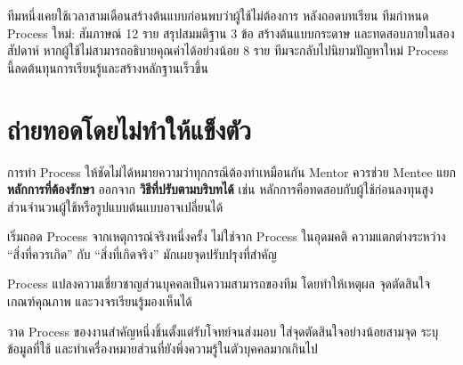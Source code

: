 \begin{examplebox}
ทีมหนึ่งเคยใช้เวลาสามเดือนสร้างต้นแบบก่อนพบว่าผู้ใช้ไม่ต้องการ หลังถอดบทเรียน ทีมกำหนด Process ใหม่: สัมภาษณ์ 12 ราย สรุปสมมติฐาน 3 ข้อ สร้างต้นแบบกระดาษ และทดสอบภายในสองสัปดาห์ หากผู้ใช้ไม่สามารถอธิบายคุณค่าได้อย่างน้อย 8 ราย ทีมจะกลับไปนิยามปัญหาใหม่ Process นี้ลดต้นทุนการเรียนรู้และสร้างหลักฐานเร็วขึ้น
\end{examplebox}

\section{ถ่ายทอดโดยไม่ทำให้แข็งตัว}
การทำ Process ให้ชัดไม่ได้หมายความว่าทุกกรณีต้องทำเหมือนกัน Mentor ควรช่วย Mentee แยก \textbf{หลักการที่ต้องรักษา} ออกจาก \textbf{วิธีที่ปรับตามบริบทได้} เช่น หลักการคือทดสอบกับผู้ใช้ก่อนลงทุนสูง ส่วนจำนวนผู้ใช้หรือรูปแบบต้นแบบอาจเปลี่ยนได้


\begin{mentornote}
เริ่มถอด Process จากเหตุการณ์จริงหนึ่งครั้ง ไม่ใช่จาก Process ในอุดมคติ ความแตกต่างระหว่าง \enquote{สิ่งที่ควรเกิด} กับ \enquote{สิ่งที่เกิดจริง} มักเผยจุดปรับปรุงที่สำคัญ
\end{mentornote}

\begin{keytakeaway}
Process แปลงความเชี่ยวชาญส่วนบุคคลเป็นความสามารถของทีม โดยทำให้เหตุผล จุดตัดสินใจ เกณฑ์คุณภาพ และวงจรเรียนรู้มองเห็นได้
\end{keytakeaway}

\begin{reflection}
วาด Process ของงานสำคัญหนึ่งชิ้นตั้งแต่รับโจทย์จนส่งมอบ ใส่จุดตัดสินใจอย่างน้อยสามจุด ระบุข้อมูลที่ใช้ และทำเครื่องหมายส่วนที่ยังพึ่งความรู้ในตัวบุคคลมากเกินไป
\blankline\blankline
\end{reflection}


